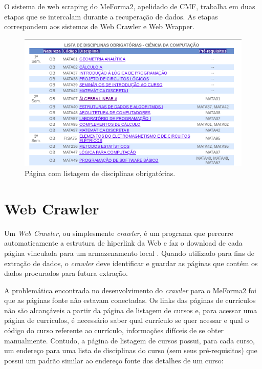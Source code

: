 O sistema de web scraping do MeForma2, apelidado de CMF, trabalha em duas etapas que se intercalam durante a recuperação de dados. As etapas correspondem aos sistemas de Web Crawler e Web Wrapper.

\begin{figure}[H]
    \centering
    \includegraphics[scale=0.75]{pics/c4/2-requireds.png}
    \caption{Página com listagem de disciplinas obrigatórias.}
    \label{requireds}
\end{figure}

\section{Web Crawler}

Um \textit{Web Crawler}, ou simplesmente \textit{crawler}, é um programa que percorre automaticamente a estrutura de hiperlink da Web e faz o download de cada página vinculada para um armazenamento local \cite{liu}. Quando utilizado para fins de extração de dados, o \textit{crawler} deve identificar e guardar as páginas que contém os dados procurados para futura extração.

A problemática encontrada no desenvolvimento do \textit{crawler} para o MeForma2 foi que as páginas fonte não estavam conectadas. Os links das páginas de currículos não são alcançáveis a partir da página de listagem de cursos e, para acessar uma página de currículos, é necessário saber qual currículo se quer acessar e qual o código do curso referente ao currículo, informações difíceis de se obter manualmente. Contudo, a página de listagem de cursos possui, para cada curso, um endereço para uma lista de disciplinas do curso (sem seus pré-requisitos) que possui um padrão similar ao endereço fonte dos detalhes de um curso:

